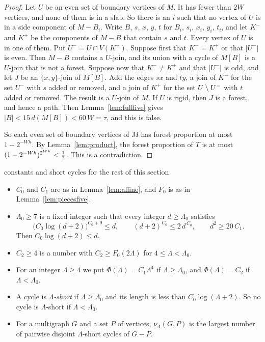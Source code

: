 \begin{proof}
 Let $U$ be an even set of boundary vertices of $M$. It has fewer than $2W$
vertices, and none of them is in a slab. So there is an $i$ such that no vertex of $U$ is in a
side component of $M-B_i$. Write $B$, $s$, $x$, $y$, $t$ for $B_i$, $s_i$, $x_i$, $y_i$, $t_i$,
and let $K^{-}$ and $K^{+}$ be the components of $M-B$ that contain $s$ and $t$. Every vertex
of $U$ is in one of them. Put $U^{-}=U\cap V(K^{-})$. Suppose first that $K^{-}=K^{+}$ or that
$|U^{-}|$ is even. Then $M-B$ contains a $U$-join, and its union with a cycle of $M[B]$ is a
$U$-join that is not a forest. Suppose now that $K^{-}\ne K^{+}$ and that $|U^{-}|$ is odd, and
let $J$ be an $\{x,y\}$-join of $M[B]$. Add the edges $sx$ and $ty$, a join of $K^{-}$ for the
set $U^{-}$ with $s$ added or removed, and a join of $K^{+}$ for the set $U\setminus U^{-}$ with $t$
added or removed. The result is a $U$-join of $M$. If $U$ is rigid, then $J$ is a forest, and
hence a path. Then Lemma~\ref{lem:fullfive} gives $|B|<15\,d(M[B])<60\,W=\tau$, and this is
false.

So each even set of boundary vertices of $M$ has forest proportion at most $1-2^{-Wh}$. By
Lemma~\ref{lem:product}, the forest proportion of $T$ is at most
$(1-2^{-Wh})^{2^{Wh}}<\tfrac12$. This is a contradiction.
\end{proof}

\begin{notation}{constants and short cycles for the rest of this section}
\begin{itemize}[leftmargin=1.2em]
\item $C_0$ and $C_1$ are as in Lemma~\ref{lem:affine}, and $F_0$ is as in
Lemma~\ref{lem:piecesfive}.
\item $\Lambda_0\ge7$ is a fixed integer such that every integer $d\ge\Lambda_0$ satisfies
\[
  \bigl(C_0\log(d+2)\bigr)^{C_0+9}\le d,\qquad (d+2)^{C_0}\le2\,d^{\,C_0},\qquad d^{2}\ge20\,C_1 .
\]
Then $C_0\log(d+2)\le d$.
\item $C_2\ge4$ is a number with $C_2\ge F_0(2\Lambda)$ for $4\le\Lambda<\Lambda_0$.
\item For an integer $\Lambda\ge4$ we put $\Phi(\Lambda)=C_1\Lambda^{4}$ if
$\Lambda\ge\Lambda_0$, and $\Phi(\Lambda)=C_2$ if $\Lambda<\Lambda_0$.
\item A cycle is \emph{$\Lambda$-short} if $\Lambda\ge\Lambda_0$ and its length is less than
$C_0\log(\Lambda+2)$. So no cycle is $\Lambda$-short if $\Lambda<\Lambda_0$.
\item For a multigraph $G$ and a set $P$ of vertices, $\nu_\Lambda(G,P)$ is the largest number
of pairwise disjoint $\Lambda$-short cycles of $G-P$.
\end{itemize}
\end{notation}

